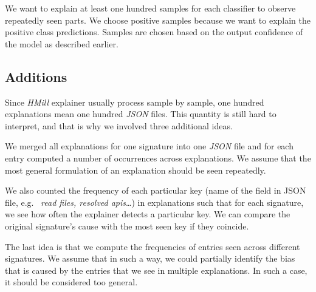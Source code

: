We want to explain at least one hundred samples for each classifier to observe repeatedly seen parts. We choose positive samples because we want to explain the positive class predictions. Samples are chosen based on the output confidence of the model as described earlier.

\subsection{Additions}
Since \emph{HMill} explainer usually process sample by sample, one hundred explanations mean one hundred \emph{JSON} files. This quantity is still hard to interpret, and that is why we involved three additional ideas.

We merged all explanations for one signature into one \emph{JSON} file and for each entry computed a number of occurrences across explanations. We assume that the most general formulation of an explanation should be seen repeatedly. 

We also counted the frequency of each particular key (name of the field in JSON file, e.g. \ \emph{read files, resolved apis}\dots) in explanations such that for each signature, we see how often the explainer detects a particular key. We can compare the original signature's cause with the most seen key if they coincide.

The last idea is that we compute the frequencies of entries seen across different signatures. We assume that in such a way, we could partially identify the bias that is caused by the entries that we see in multiple explanations. In such a case, it should be considered too general.







